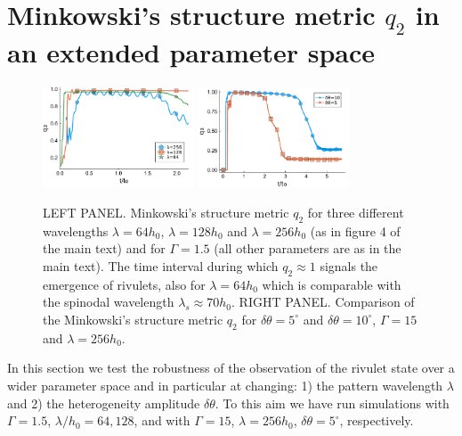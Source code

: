 \documentclass[amsmath,amssymb,showpacs,prl,superscriptaddress,notitlepage]{revtex4-1}
\begin{document}
\section{Minkowski's structure metric $q_2$ in an extended parameter space}
\begin{figure}
    \centering
    \includegraphics[width=0.4\textwidth]{SupMatFig_1.pdf}
    \includegraphics[width=0.4\textwidth]{SupMatFig_2.pdf}
    \caption{LEFT PANEL. Minkowski's structure metric $q_2$ for three different wavelengths $\lambda=64 h_0$, $\lambda=128 h_0$ and 
    $\lambda=256 h_0$ (as in figure 4 of the main text) and for $\Gamma=1.5$ (all other parameters are as in the main text). 
    The time interval during which $q_2 \approx 1$ signals the emergence of rivulets, also for $\lambda = 64 h_0$ which is comparable with the spinodal wavelength $\lambda_s \approx 70 h_0$. RIGHT PANEL. Comparison of the Minkowski's structure metric $q_2$ for $\delta\theta=5^{\circ}$ and $\delta\theta=10^{\circ}$, 
    $\Gamma = 15$ and $\lambda = 256 h_0$.}
    \label{fig:q2_difflambda}
\end{figure}
\noindent In this section we test the robustness of the observation of the rivulet 
state over a wider parameter space and in particular at changing: 1) the 
pattern wavelength $\lambda$ and 2) the heterogeneity amplitude $\delta \theta$.
To this aim we have run simulations with $\Gamma=1.5$, $\lambda/h_0 = 64, 128$, and with $\Gamma = 15$, $\lambda = 256 h_0$, $\delta \theta = 5^{\circ}$, respectively.
\end{document}
